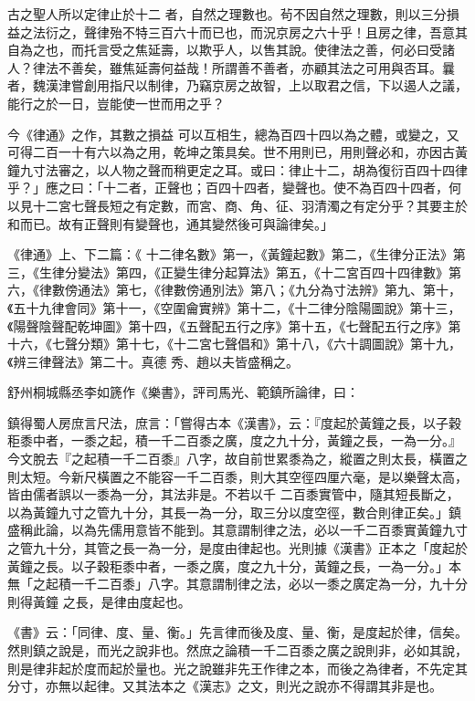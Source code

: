 \begin{pinyinscope}
 古之聖人所以定律止於十二
 者，自然之理數也。茍不因自然之理數，則以三分損益之法衍之，聲律殆不特三百六十而已也，而況京房之六十乎！且房之律，吾意其自為之也，而托言受之焦延壽，以欺乎人，以售其說。使律法之善，何必曰受諸人？律法不善矣，雖焦延壽何益哉！所謂善不善者，亦顧其法之可用與否耳。曩者，魏漢津嘗創用指尺以制律，乃竊京房之故智，上以取君之信，下以遏人之議，能行之於一日，豈能使一世而用之乎？



 今《律通》之作，其數之損益
 可以互相生，總為百四十四以為之體，或變之，又可得二百一十有六以為之用，乾坤之策具矣。世不用則已，用則聲必和，亦因古黃鐘九寸法審之，以人物之聲而稍更定之耳。或曰：律止十二，胡為復衍百四十四律乎？」應之曰：「十二者，正聲也；百四十四者，變聲也。使不為百四十四者，何以見十二宮七聲長短之有定數，而宮、商、角、征、羽清濁之有定分乎？其要主於和而已。故有正聲則有變聲也，通其變然後可與論律矣。」



 《律通》上、下二篇：《
 十二律名數》第一，《黃鐘起數》第二，《生律分正法》第三，《生律分變法》第四，《正變生律分起算法》第五，《十二宮百四十四律數》第六，《律數傍通法》第七，《律數傍通別法》第八；《九分為寸法辨》第九、第十，《五十九律會同》第十一，《空圍龠實辨》第十二，《十二律分陰陽圖說》第十三，《陽聲陰聲配乾坤圖》第十四，《五聲配五行之序》第十五，《七聲配五行之序》第十六，《七聲分類》第十七，《十二宮七聲倡和》第十八，《六十調圖說》第十九，《辨三律聲法》第二十。真德
 秀、趙以夫皆盛稱之。



 舒州桐城縣丞李如篪作《樂書》，評司馬光、範鎮所論律，曰：



 鎮得蜀人房庶言尺法，庶言：「嘗得古本《漢書》，云：『度起於黃鐘之長，以子穀秬黍中者，一黍之起，積一千二百黍之廣，度之九十分，黃鐘之長，一為一分。』今文脫去『之起積一千二百黍』八字，故自前世累黍為之，縱置之則太長，橫置之則太短。今新尺橫置之不能容一千二百黍，則大其空徑四厘六毫，是以樂聲太高，皆由儒者誤以一黍為一分，其法非是。不若以千
 二百黍實管中，隨其短長斷之，以為黃鐘九寸之管九十分，其長一為一分，取三分以度空徑，數合則律正矣。」鎮盛稱此論，以為先儒用意皆不能到。其意謂制律之法，必以一千二百黍實黃鐘九寸之管九十分，其管之長一為一分，是度由律起也。光則據《漢書》正本之「度起於黃鐘之長。以子穀秬黍中者，一黍之廣，度之九十分，黃鐘之長，一為一分。」本無「之起積一千二百黍」八字。其意謂制律之法，必以一黍之廣定為一分，九十分則得黃鐘
 之長，是律由度起也。



 《書》云：「同律、度、量、衡。」先言律而後及度、量、衡，是度起於律，信矣。然則鎮之說是，而光之說非也。然庶之論積一千二百黍之廣之說則非，必如其說，則是律非起於度而起於量也。光之說雖非先王作律之本，而後之為律者，不先定其分寸，亦無以起律。又其法本之《漢志》之文，則光之說亦不得謂其非是也。




\end{pinyinscope}
